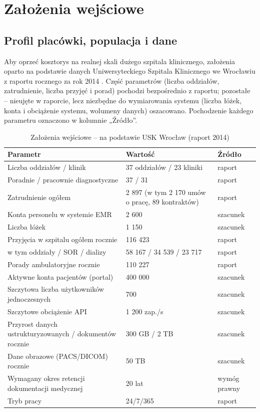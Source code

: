 \section{Założenia wejściowe}

\subsection{Profil placówki, populacja i dane}

Aby oprzeć kosztorys na realnej skali dużego szpitala klinicznego, założenia oparto na podstawie danych Uniwersyteckiego Szpitala Klinicznego we Wrocławiu z raportu rocznego za rok 2014 \cite{USK_Raport_2014}. Część parametrów (liczba oddziałów, zatrudnienie, liczba przyjęć i porad) pochodzi bezpośrednio z raportu; pozostałe -- nieujęte w raporcie, lecz niezbędne do wymiarowania systemu (liczba łóżek, konta i obciążenie systemu, wolumeny danych) oszacowano. Pochodzenie każdego parametru oznaczono w kolumnie „Źródło”.

\begin{table}[h]
\centering
\small
\renewcommand{\arraystretch}{1.15}
\begin{tabular}{|L{5.4cm}|L{6.4cm}|L{2.4cm}|}
\hline
{}\textbf{Parametr} & \textbf{Wartość} & \textbf{Źródło} \\
\hline
Liczba oddziałów / klinik & 37 oddziałów / 23 kliniki & raport \\
\hline
Poradnie / pracownie diagnostyczne & 37 / 31 & raport \\
\hline
Zatrudnienie ogółem & 2 897 (w tym 2 170 umów o pracę, 89 kontraktów) & raport \\
\hline
Konta personelu w systemie EMR & 2 600 & szacunek \\
\hline
Liczba łóżek & 1 150 & szacunek \\
\hline
Przyjęcia w szpitalu ogółem rocznie & 116 423 & raport \\
\hline
\quad w tym oddziały / SOR / dializy & 58 167 / 34 539 / 23 717 & raport \\
\hline
Porady ambulatoryjne rocznie & 110 227 & raport \\
\hline
Aktywne konta pacjentów (portal) & 400 000 & szacunek \\
\hline
Szczytowa liczba użytkowników jednoczesnych & 700 & szacunek \\
\hline
Szczytowe obciążenie API & 1 200 zap./s & szacunek \\
\hline
Przyrost danych ustrukturyzowanych / dokumentów rocznie & 300 GB / 2 TB & szacunek \\
\hline
Dane obrazowe (PACS/DICOM) rocznie & 50 TB & szacunek \\
\hline
Wymagany okres retencji dokumentacji medycznej & 20 lat & wymóg prawny \\
\hline
Tryb pracy & 24/7/365 & raport \\
\hline
\end{tabular}
\caption{Założenia wejściowe -- na podstawie USK Wrocław (raport 2014)}
\label{tab:zalozenia}
\end{table}

